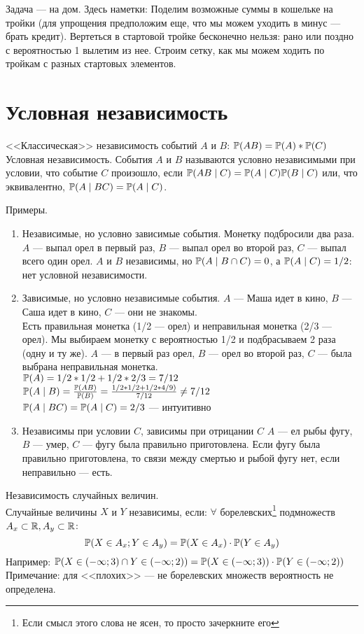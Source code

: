 Задача --- на дом. Здесь наметки:
Поделим возможные суммы в кошельке на тройки (для упрощения предположим еще, что мы можем уходить в минус --- брать кредит). Вертеться в стартовой тройке бесконечно нельзя: рано или поздно с вероятностью 1 вылетим из нее. Строим сетку, как мы можем ходить по тройкам с разных стартовых элементов. 

\section{Условная независимость}

<<Классическая>> независимость событий $A$ и $B$: $\P(AB)=\P(A)*\P(C)$
Условная независимость. События $A$ и $B$ называются условно независимыми при условии, что событие $C$ произошло, если $\P(AB \mid C)=\P(A \mid C)\P(B \mid C)$ или, что эквивалентно, $\P(A\mid BC)=\P(A\mid C)$. 

Примеры.
\begin{enumerate}
\item Независимые, но условно зависимые события.
Монетку подбросили два раза. $A$ --- выпал орел в первый раз, $B$ --- выпал орел во второй раз, $C$ --- выпал всего один орел. $A$ и $B$ независимы, но $\P(A\mid B\cap C)=0$, а $\P(A\mid C)=1/2$: нет условной независимости.
\item Зависимые, но условно независимые события.
$A$ --- Маша идет в кино, $B$ --- Саша идет в кино, $C$ --- они не знакомы.\\

Есть правильная монетка (1/2 --- орел) и неправильная монетка (2/3 --- орел). Мы выбираем монетку с вероятностью 1/2 и подбрасываем 2 раза (одну и ту же). $A$ --- в первый раз орел, $B$ --- орел во второй раз, $C$ --- была выбрана неправильная монетка.\\
$\P(A)=1/2*1/2+1/2*2/3=7/12$\\
$\P(A\mid B)=\frac{\P(AB)}{\P(B)}=\frac{1/2*1/2+1/2*4/9)}{7/12} \not = 7/12$\\
$\P(A\mid BC)=\P(A\mid C)=2/3$ --- интуитивно
\item Независимы при условии $C$, зависимы при отрицании $C$
$A$ --- ел рыбы фугу, $B$ --- умер, $C$ --- фугу была правильно приготовлена.
Если фугу была правильно приготовлена, то связи между смертью и рыбой фугу нет, если неправильно --- есть.
\end{enumerate}

Независимость случайных величин.\\
Случайные величины $X$ и $Y$ независимы, если:
$\forall$ борелевских\footnote{Если смысл этого слова не ясен, то просто зачеркните его}  подмножеств $A_x\subset\R, A_y\subset\R$:
 \begin{equation}
\P(X\in A_x;Y\in A_y)=\P(X\in A_x)\cdot \P(Y\in A_y)
\end{equation}
Например: $\P(X\in(-\infty;3)\cap Y\in (-\infty; 2))=\P(X \in (-\infty;3))\cdot \P(Y \in (-\infty;2))$
Примечание: для <<плохих>> --- не борелевских множеств вероятность не определена. 

